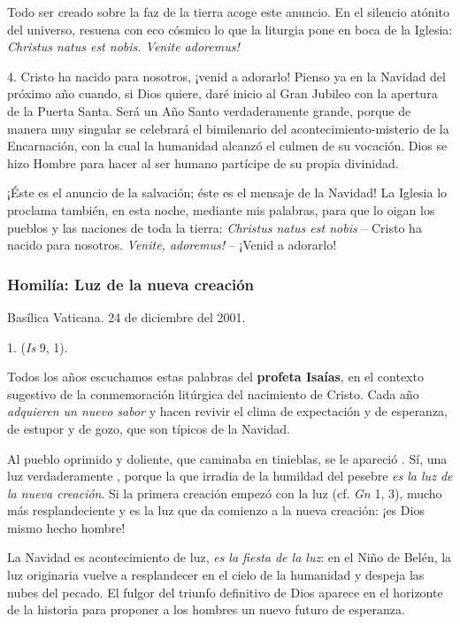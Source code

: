 Todo ser creado sobre la faz de la tierra acoge este anuncio. En el silencio atónito del universo, resuena con eco cósmico lo que la liturgia pone en boca de la Iglesia: \emph{Christus natus est nobis. Venite adoremus!}

4. Cristo ha nacido para nosotros, ¡venid a adorarlo! Pienso ya en la Navidad del próximo año cuando, si Dios quiere, daré inicio al Gran Jubileo con la apertura de la Puerta Santa. Será un Año Santo verdaderamente grande, porque de manera muy singular se celebrará el bimilenario del acontecimiento-misterio de la Encarnación, con la cual la humanidad alcanzó el culmen de su vocación. Dios se hizo Hombre para hacer al ser humano partícipe de su propia divinidad.

¡Éste es el anuncio de la salvación; éste es el mensaje de la Navidad! La Iglesia lo proclama también, en esta noche, mediante mis palabras, para que lo oigan los pueblos y las naciones de toda la tierra: \emph{Christus natus est nobis} -- Cristo ha nacido para nosotros. \emph{Venite, adoremus!} -- ¡Venid a adorarlo!

\subsubsection{Homilía: Luz de la nueva creación}

Basílica Vaticana. 24 de diciembre del 2001.

1. \emph{} (\emph{Is} 9, 1).

Todos los años escuchamos estas palabras del \textbf{profeta Isaías}, en el contexto sugestivo de la conmemoración litúrgica del nacimiento de Cristo. Cada año \emph{adquieren un nuevo sabor} y hacen revivir el clima de expectación y de esperanza, de estupor y de gozo, que son típicos de la Navidad.

Al pueblo oprimido y doliente, que caminaba en tinieblas, se le apareció . Sí, una luz verdaderamente , porque la que irradia de la humildad del pesebre \emph{es la luz de la nueva creación}. Si la primera creación empezó con la luz (cf. \emph{Gn} 1, 3), mucho más resplandeciente y  es la luz que da comienzo a la nueva creación: ¡es Dios mismo hecho hombre!

La Navidad es acontecimiento de luz, \emph{es la fiesta de la luz}: en el Niño de Belén, la luz originaria vuelve a resplandecer en el cielo de la humanidad y despeja las nubes del pecado. El fulgor del triunfo definitivo de Dios aparece en el horizonte de la historia para proponer a los hombres un nuevo futuro de esperanza.

